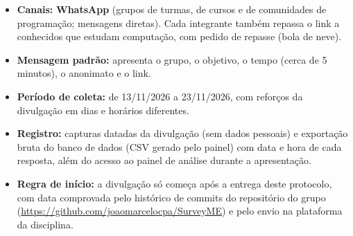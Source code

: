 \documentclass[11pt,a4paper]{article}
\begin{document}
\begin{itemize}
  \item \textbf{Canais:} \textbf{WhatsApp} (grupos de turmas, de cursos e de comunidades de programação; mensagens diretas). Cada integrante também repassa o link a conhecidos que estudam computação, com pedido de repasse (bola de neve).
  \item \textbf{Mensagem padrão:} apresenta o grupo, o objetivo, o tempo (cerca de 5 minutos), o anonimato e o link.
  \item \textbf{Período de coleta:} de 13/11/2026 a 23/11/2026, com reforços da divulgação em dias e horários diferentes.
  \item \textbf{Registro:} capturas datadas da divulgação (sem dados pessoais) e exportação bruta do banco de dados (CSV gerado pelo painel) com data e hora de cada resposta, além do acesso ao painel de análise durante a apresentação.
  \item \textbf{Regra de início:} a divulgação só começa após a entrega deste protocolo, com data comprovada pelo histórico de commits do repositório do grupo (\url{https://github.com/joaomarcelocpa/SurveyME}) e pelo envio na plataforma da disciplina.
\end{itemize}
\end{document}
